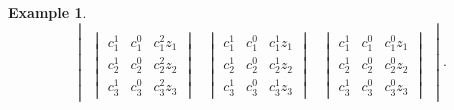 \documentclass[11pt]{article}
\numberwithin{equation}{section}
\theoremstyle{definition}
\newtheorem{example}[theorem]{Example}
\theoremstyle{plain}
\begin{document}
\begin{example}
\[\begin{vmatrix*}
      \\
      \begin{vmatrix*}
        c_1^1 & c_1^0 & c_1^2 z_1 \\
        c_2^1 & c_2^0 & c_2^2 z_2 \\
        c_3^1 & c_3^0 & c_3^2 z_3 
      \end{vmatrix*}
      &
      \begin{vmatrix*}
        c_1^1 & c_1^0 & c_1^1 z_1 \\
        c_2^1 & c_2^0 & c_2^1 z_2 \\
        c_3^1 & c_3^0 & c_3^1 z_3 
      \end{vmatrix*}
      &
      \begin{vmatrix*}
        c_1^1 & c_1^0 & c_1^0 z_1 \\
        c_2^1 & c_2^0 & c_2^0 z_2 \\
        c_3^1 & c_3^0 & c_3^0 z_3 
      \end{vmatrix*}
    \end{vmatrix*}.
  \]
  \endgroup
\end{example}
\end{document}

